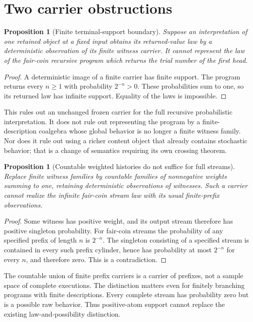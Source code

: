 \documentclass[11pt]{article}
\newtheorem{proposition}[theorem]{Proposition}
\begin{document}
\section{Two carrier obstructions}
\begin{proposition}[Finite terminal-support boundary]
Suppose an interpretation of one retained object at a fixed input obtains its returned-value law by a deterministic observation of its finite witness carrier. It cannot represent the law of the fair-coin recursive program which returns the trial number of the first head.
\end{proposition}
\begin{proof}
A deterministic image of a finite carrier has finite support. The program returns every $n\ge1$ with probability $2^{-n}>0$. These probabilities sum to one, so its returned law has infinite support. Equality of the laws is impossible.
\end{proof}
This rules out an unchanged frozen carrier for the full recursive probabilistic interpretation. It does not rule out representing the program by a finite-description coalgebra whose global behavior is no longer a finite witness family. Nor does it rule out using a richer content object that already contains stochastic behavior; that is a change of semantics requiring its own crossing theorem.

\begin{proposition}[Countable weighted histories do not suffice for full streams]
Replace finite witness families by countable families of nonnegative weights summing to one, retaining deterministic observations of witnesses. Such a carrier cannot realize the infinite fair-coin stream law with its usual finite-prefix observations.
\end{proposition}
\begin{proof}
Some witness has positive weight, and its output stream therefore has positive singleton probability. For fair-coin streams the probability of any specified prefix of length $n$ is $2^{-n}$. The singleton consisting of a specified stream is contained in every such prefix cylinder, hence has probability at most $2^{-n}$ for every $n$, and therefore zero. This is a contradiction.
\end{proof}
The countable union of finite prefix carriers is a carrier of prefixes, not a sample space of complete executions. The distinction matters even for finitely branching programs with finite descriptions. Every complete stream has probability zero but is a possible raw behavior. Thus positive-atom support cannot replace the existing law-and-possibility distinction.
\end{document}
